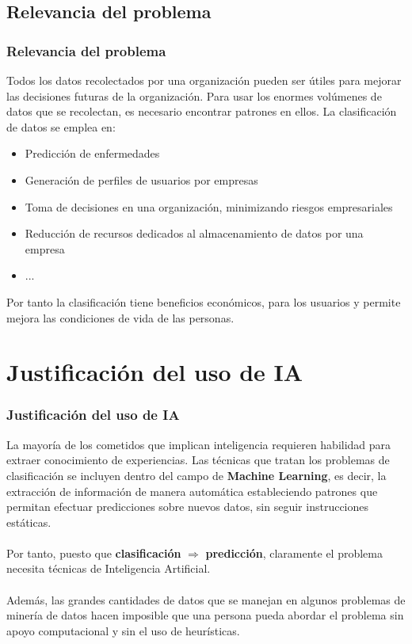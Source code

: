 \documentclass[8pt]{beamer}
\begin{document}
\subsection{Relevancia del problema}
  \begin{frame}
    \frametitle{Relevancia del problema}
    
    Todos los datos recolectados por una organización pueden ser útiles para
    mejorar las decisiones futuras de la organización. Para usar los enormes
    volúmenes de datos que se recolectan, es necesario encontrar patrones en
    ellos. La clasificación de datos se emplea en:
    
    
    \begin{itemize}
     \item Predicción de enfermedades
     \item Generación de perfiles de usuarios por empresas
     \item Toma de decisiones en una organización, minimizando riesgos empresariales
     \item Reducción de recursos dedicados al almacenamiento de datos por una empresa
     \item ...
    \end{itemize}
    
    Por tanto la clasificación tiene beneficios económicos, para los usuarios y
    permite mejora las condiciones de vida de las personas.
  \end{frame}
  

\section{Justificación del uso de IA}
  \begin{frame}
    \frametitle{Justificación del uso de IA}
      La mayoría de los cometidos que implican inteligencia requieren habilidad
      para extraer conocimiento de experiencias. Las técnicas que tratan los problemas 
      de clasificación se incluyen dentro del campo de \textbf{Machine Learning},
      es decir, la extracción de información de manera automática estableciendo patrones
      que permitan efectuar predicciones sobre nuevos datos, sin seguir instrucciones 
      estáticas. 
      \\~\\
      Por tanto, puesto que \textbf{clasificación} $\Longrightarrow$ 
      \textbf{predicción}, claramente el problema necesita técnicas de Inteligencia 
      Artificial.
      \\~\\
      Además, las grandes cantidades de datos que se manejan en algunos problemas
      de minería de datos hacen imposible que una persona pueda abordar el problema
      sin apoyo computacional y sin el uso de heurísticas.
  \end{frame}
\end{document}
